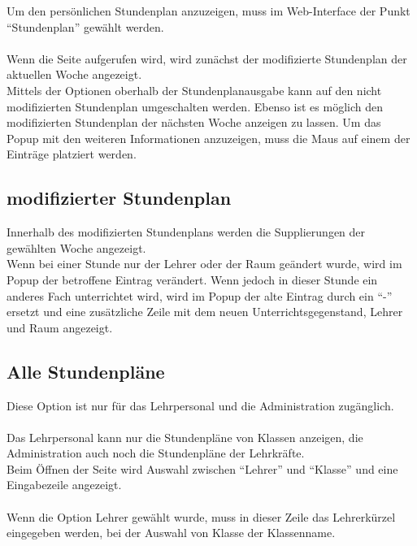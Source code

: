 Um den persönlichen Stundenplan anzuzeigen, muss im Web-Interface der Punkt \enquote{Stundenplan} gewählt werden. \\
\\
Wenn die Seite aufgerufen wird, wird zunächst der modifizierte Stundenplan der aktuellen Woche angezeigt.\\
Mittels der Optionen oberhalb der Stundenplanausgabe kann auf den nicht modifizierten Stundenplan umgeschalten werden. Ebenso ist es möglich den modifizierten Stundenplan der nächsten Woche anzeigen zu lassen.
Um das Popup mit den weiteren Informationen anzuzeigen, muss die Maus auf einem der Einträge platziert werden.
\subsection{modifizierter Stundenplan}
Innerhalb des modifizierten Stundenplans werden die Supplierungen der gewählten Woche angezeigt.\\
Wenn bei einer Stunde nur der Lehrer oder der Raum geändert wurde, wird im Popup der betroffene Eintrag verändert. Wenn jedoch in dieser Stunde ein anderes Fach unterrichtet wird, wird im Popup der alte Eintrag durch ein \enquote{-} ersetzt und eine zusätzliche Zeile mit dem neuen Unterrichtsgegenstand, Lehrer und Raum angezeigt.
\subsection{Alle Stundenpläne}
Diese Option ist nur für das Lehrpersonal und die Administration zugänglich.\\\\
Das Lehrpersonal kann nur die Stundenpläne von Klassen anzeigen, die Administration auch noch die Stundenpläne der Lehrkräfte.\\
Beim Öffnen der Seite wird Auswahl zwischen \enquote{Lehrer} und \enquote{Klasse} und eine Eingabezeile angezeigt.\\
\\
Wenn die Option Lehrer gewählt wurde, muss in dieser Zeile das Lehrerkürzel eingegeben werden, bei der Auswahl von Klasse der Klassenname.